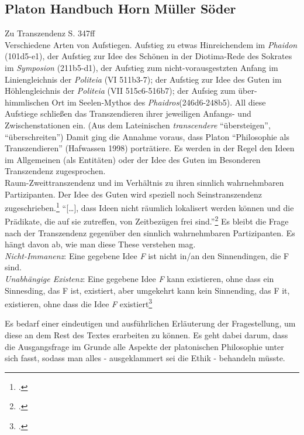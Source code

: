 \documentclass[12pt]{article}
\begin{document}
\subsection*{Platon Handbuch Horn Müller Söder}
Zu Transzendenz S. 347ff\\
Verschiedene Arten von Aufstiegen. Aufstieg zu etwas Hinreichendem im \emph{Phaidon} (101d5-e1), der Aufstieg zur Idee des Schönen in der Diotima-Rede des Sokrates im \emph{Symposion} (211b5-d1), der Aufstieg zum nicht-vorausgestzten Anfang im Liniengleichnis der \emph{Politeia} (VI 511b3-7); der Aufstieg zur Idee des Guten im Höhlengleichnis der \emph{Politeia} (VII 515c6-516b7); der Aufsieg zum über-himmlischen Ort im Seelen-Mythos des \emph{Phaidros}(246d6-248b5). All diese Aufstiege schließen das Transzendieren ihrer jeweiligen Anfangs- und Zwischenstationen ein. (Aus dem Lateinischen \emph{transcendere} \enquote{übersteigen}, \enquote{überschreiten}) 
Damit ging die Annahme voraus, dass Platon \enquote{Philosophie als Transzendieren} (Hafwassen 1998) porträtiere. 
Es werden in der Regel den Ideen im Allgemeinen (als Entitäten) oder der Idee des Guten im Besonderen Transzendenz zugesprochen.\\
Raum-Zweittranszendenz und im Verhältnis zu ihren sinnlich wahrnehmbaren Partizipanten. Der Idee des Guten wird speziell noch Seinstranszendenz zugeschrieben.\footcite[vgl.][S. 347]{StrobelTranszendenz}
\enquote{[\dots], dass Ideen nicht räumlich lokalisert werden können und die Prädikate, die auf sie zutreffen, von Zeitbezügen frei sind.}\footcite[vgl.][S. 347]{StrobelTranszendenz}
Es bleibt die Frage nach der Transzendenz gegenüber den sinnlich wahrnehmbaren Partizipanten. Es hängt davon ab, wie man diese These verstehen mag.\\
\emph{Nicht-Immanenz}: Eine gegebene Idee \emph{F} ist nicht in/an den Sinnendingen, die F sind.\\
\emph{Unabhängige Existenz}: Eine gegebene Idee \emph{F} kann existieren, ohne dass ein Sinnesding, das F ist, existiert, aber umgekehrt kann kein Sinnending, das F it, existieren, ohne dass die Idee \emph{F} existiert\footcite[][S.348]{StrobelTranszendenz}

Es bedarf einer eindeutigen und ausführlichen Erläuterung der Fragestellung, um diese an dem Rest des Textes erarbeiten zu können. Es geht dabei darum, dass die Ausgangsfrage im Grunde alle Aspekte der platonischen Philosophie unter sich fasst, sodass man alles - ausgeklammert sei die Ethik - behandeln müsste.
\end{document}
